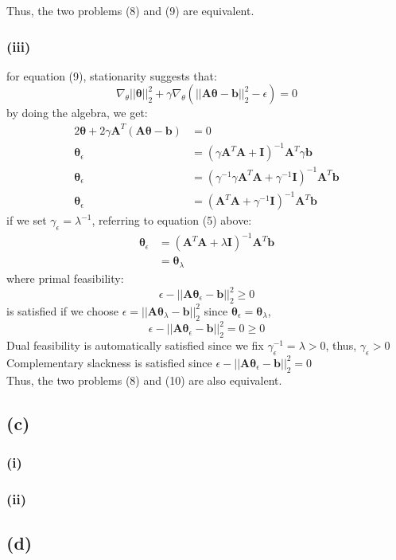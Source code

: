 \documentclass[11pt]{article}
\begin{document}
\noindent Thus, the two problems (8) and (9) are equivalent.
\subsubsection*{(iii)}
for equation (9), stationarity suggests that:
\begin{equation}
\nabla_\theta||\pmb{\theta}||^2_2+\gamma\nabla_\theta(||\pmb{A\theta}-\pmb{b}||^2_2-\epsilon)=0
\end{equation}
by doing the algebra, we get:
\begin{equation}
\begin{split}
2\pmb{\theta}+2\gamma\pmb{A}^T(\pmb{A\theta}-\pmb{b})&=0\\
\pmb{\theta}_\epsilon&=(\gamma\pmb{A}^T\pmb{A}+\pmb{I})^{-1}\pmb{A}^T\gamma\pmb{b}\\
\pmb{\theta}_\epsilon&=(\gamma^{-1}\gamma\pmb{A}^T\pmb{A}+\gamma^{-1}\pmb{I})^{-1}\pmb{A}^T\pmb{b}\\
\pmb{\theta}_\epsilon&=(\pmb{A}^T\pmb{A}+\gamma^{-1}\pmb{I})^{-1}\pmb{A}^T\pmb{b}
\end{split}
\end{equation}
if we set $\gamma_\epsilon=\lambda^{-1}$, referring to equation (5) above:\\
\begin{equation}
\begin{split}
\pmb{\theta}_\epsilon&=(\pmb{A}^T\pmb{A}+\lambda\pmb{I})^{-1}\pmb{A}^T\pmb{b}\\
&=\pmb{\theta}_\lambda
\end{split}
\end{equation}
where primal feasibility:
$$\epsilon-||\pmb{A\theta}_\epsilon-\pmb{b}||^2_2\ge 0$$
is satisfied if we choose $\epsilon = ||\pmb{A\theta}_\lambda-\pmb{b}||^2_2$ since $\pmb{\theta}_\epsilon = \pmb{\theta}_\lambda$,\\
$$\epsilon-||\pmb{A\theta}_\epsilon-\pmb{b}||^2_2=0\ge0$$
Dual feasibility is automatically satisfied since we fix $\gamma_\epsilon^{-1}=\lambda>0$, thus, $
\gamma_\epsilon > 0$\\
Complementary slackness is satisfied since 	$\epsilon-||\pmb{A\theta}_\epsilon-\pmb{b}||^2_2=0$\\

\noindent Thus, the two problems (8) and (10) are also equivalent.
\subsection*{(c)}
\subsubsection*{(i)}
\subsubsection*{(ii)}
\subsection*{(d)}
\end{document}
